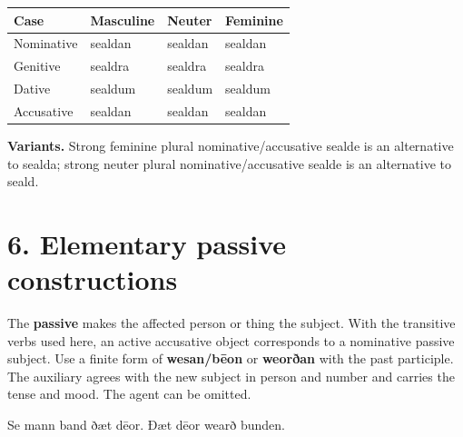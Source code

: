 \par\begingroup
\fontsize{10.5}{13.2}\selectfont
\setlength{\LTleft}{0pt}\setlength{\LTright}{\fill}
\noindent
\begin{tabular}{@{}>{\raggedright\arraybackslash}p{22.0mm}>{\raggedright\arraybackslash}p{31.188mm}>{\raggedright\arraybackslash}p{31.188mm}>{\raggedright\arraybackslash}p{31.188mm}@{}}
\toprule
\textbf{Case} & \textbf{Masculine} & \textbf{Neuter} & \textbf{Feminine} \\
\midrule
Nominative & sealdan & sealdan & sealdan \\
Genitive & sealdra & sealdra & sealdra \\
Dative & sealdum & sealdum & sealdum \\
Accusative & sealdan & sealdan & sealdan \\
\bottomrule
\end{tabular}
\par\endgroup
\textbf{Variants.} Strong feminine plural nominative/\allowbreak{}accusative sealde is an alternative to sealda; strong neuter plural nominative/\allowbreak{}accusative sealde is an alternative to seald.

\section*{6. Elementary passive constructions}

The \textbf{passive} makes the affected person or thing the subject. With the transitive verbs used here, an active accusative object corresponds to a nominative passive subject. Use a finite form of \textbf{wesan/\allowbreak{}bēon} or \textbf{weorðan} with the past participle. The auxiliary agrees with the new subject in person and number and carries the tense and mood. The agent can be omitted.

Se mann band ðæt dēor. Ðæt dēor wearð bunden.

